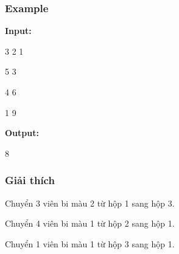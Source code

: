 \subsubsection{   Example  }

\textbf{    Input:   }

   3 2 1  

   5 3  

   4 6  

   1 9  

\textbf{    Output:   }

   8  

\subsubsection{   Giải thích  }

   Chuyển 3 viên bi màu 2 từ hộp 1 sang hộp 3.  

   Chuyển 4 viên bi màu 1 từ hộp 2 sang hộp 1.  

   Chuyển 1 viên bi màu 1 từ hộp 3 sang hộp 1.  